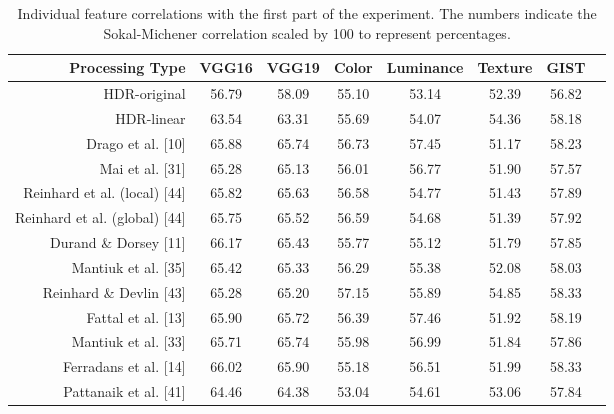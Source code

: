 \begin{sidewaystable}
\caption{Individual feature correlations with the first part of the experiment. The numbers indicate the Sokal-Michener correlation scaled by 100 to represent percentages.}
\centering
\begin{tabular}{r | c c c c c c c}
\label{tab:ind_correlation_p1}
\textbf{Processing Type} & \textbf{VGG16} & \textbf{VGG19} & \textbf{Color} & \textbf{Luminance} & \textbf{Texture} & \textbf{GIST}\\
\hline
HDR-original & 56.79 & 58.09 & 55.10 & 53.14 & 52.39 & 56.82 \\
HDR-linear & 63.54 & 63.31 & 55.69 & 54.07 & 54.36 & 58.18 \\
Drago et al. [10] & 65.88 & 65.74 & 56.73 & 57.45 & 51.17 & 58.23 \\
Mai et al. [31] & 65.28 & 65.13 & 56.01 & 56.77 & 51.90 & 57.57 \\ 
Reinhard et al. (local) [44] & 65.82 & 65.63 & 56.58 & 54.77 & 51.43 & 57.89 \\
Reinhard et al. (global) [44] & 65.75 & 65.52 & 56.59 & 54.68 & 51.39 & 57.92 \\
Durand \& Dorsey [11] & 66.17 & 65.43 & 55.77 & 55.12 & 51.79 & 57.85 \\
Mantiuk et al. [35] & 65.42 & 65.33 & 56.29 & 55.38 & 52.08 & 58.03 \\
Reinhard \& Devlin [43] & 65.28 & 65.20 & 57.15 & 55.89 & 54.85 & 58.33 \\
Fattal et al. [13] & 65.90 & 65.72 & 56.39 & 57.46 & 51.92 & 58.19 \\
Mantiuk et al. [33] & 65.71 & 65.74 & 55.98 & 56.99 & 51.84 & 57.86 \\
Ferradans et al. [14] & 66.02 & 65.90 & 55.18 & 56.51 & 51.99 & 58.33 \\
Pattanaik et al. [41] & 64.46 & 64.38 & 53.04 & 54.61 & 53.06 & 57.84 
\end{tabular}
\end{sidewaystable}


